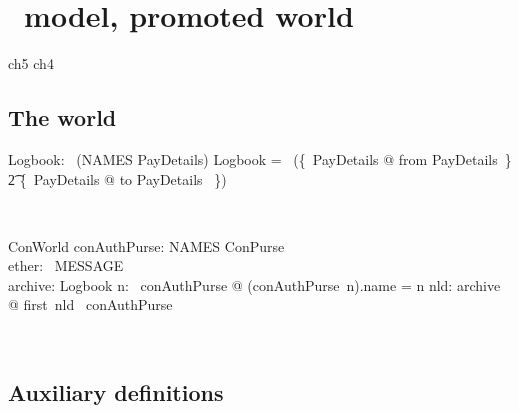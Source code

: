 \chapter{\Betw\ model, promoted world}\label{ch5}

\begin{zsection}
  \SECTION ch5 \parents ch4
\end{zsection}

\section{The world}


\begin{LADef}
\begin{axdef}
   Logbook: \power~(NAMES \rel PayDetails)
\where
   Logbook = \power~(\{~PayDetails @ from \mapsto \theta PayDetails~\} \cup \\
      \t2 \{~PayDetails @ to \mapsto \theta PayDetails ~\})
\end{axdef}~\end{LADef}
%
\begin{LSDef}
\begin{schema}{ConWorld}
   conAuthPurse: NAMES \finj ConPurse \\
   ether: \power~MESSAGE \\
   archive: Logbook
\where
   \forall n: \dom~conAuthPurse @ (conAuthPurse~n).name = n
   \also
   \forall nld: archive @ first~nld \in \dom~conAuthPurse
\end{schema}~\end{LSDef}


\section{Auxiliary definitions}\label{ch5.auxworld}

